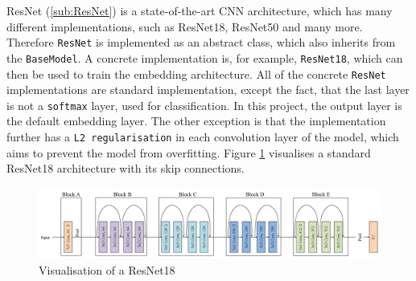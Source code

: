 \Gls{ResNet} (\ref{sub:ResNet}) is a state-of-the-art \gls{CNN} architecture, which has many different implementations, such as ResNet18, ResNet50 and many more. Therefore \texttt{ResNet} is implemented as an abstract class, which also inherits from the \texttt{BaseModel}. A concrete implementation is, for example, \texttt{ResNet18}, which can then be used to train the embedding architecture. All of the concrete \texttt{ResNet} implementations are standard implementation, except the fact, that the last layer is not a \texttt{softmax} layer, used for classification. In this project, the output layer is the default embedding layer. The other exception is that the implementation further has a \texttt{L2 regularisation} in each convolution layer of the model, which aims to prevent the model from overfitting. Figure \ref{fig:ResNet18} visualises a standard ResNet18 architecture with its skip connections.
\begin{figure}[htbp]
	\centering
	\includegraphics[width=\linewidth]{img/ResNet18.png}
	\caption[Visualisation of a ResNet18]{Visualisation of a ResNet18\footnotemark}
	\label{fig:ResNet18}
\end{figure}

